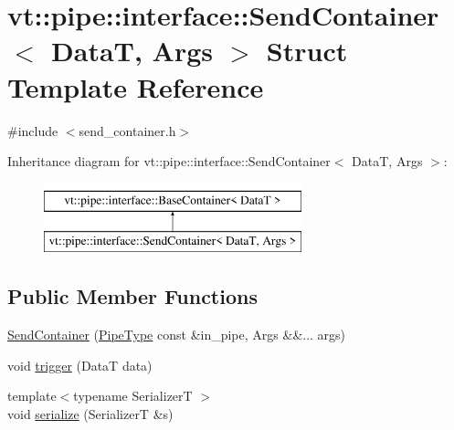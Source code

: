 \hypertarget{structvt_1_1pipe_1_1interface_1_1_send_container}{}\section{vt\+:\+:pipe\+:\+:interface\+:\+:Send\+Container$<$ DataT, Args $>$ Struct Template Reference}
\label{structvt_1_1pipe_1_1interface_1_1_send_container}


{\ttfamily \#include $<$send\+\_\+container.\+h$>$}

Inheritance diagram for vt\+:\+:pipe\+:\+:interface\+:\+:Send\+Container$<$ DataT, Args $>$\+:\begin{figure}[H]
\begin{center}
\leavevmode
\includegraphics[height=2.000000cm]{structvt_1_1pipe_1_1interface_1_1_send_container}
\end{center}
\end{figure}
\subsection*{Public Member Functions}
\begin{DoxyCompactItemize}
\item 
\hyperlink{structvt_1_1pipe_1_1interface_1_1_send_container_a8183aa3cc7165532ffc3b418316d0793}{Send\+Container} (\hyperlink{namespacevt_ac9852acda74d1896f48f406cd72c7bd3}{Pipe\+Type} const \&in\+\_\+pipe, Args \&\&... args)
\item 
void \hyperlink{structvt_1_1pipe_1_1interface_1_1_send_container_a7999c0e12e4a3fc495df87de2ced8ab0}{trigger} (DataT data)
\item 
{\footnotesize template$<$typename SerializerT $>$ }\\void \hyperlink{structvt_1_1pipe_1_1interface_1_1_send_container_a0527bd5f83ac4292051997a03faff60a}{serialize} (SerializerT \&s)
\end{DoxyCompactItemize}

